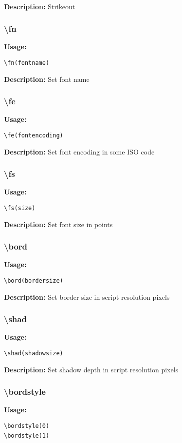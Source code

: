 \documentclass{spec}
\begin{document}
\textbf{Description:}
Strikeout

\subsubsection{\textbackslash fn}
\textbf{Usage:}
\begin{verbatim}
\fn(fontname)
\end{verbatim}

\textbf{Description:}
Set font name

\subsubsection{\textbackslash fe}
\textbf{Usage:}
\begin{verbatim}
\fe(fontencoding)
\end{verbatim}

\textbf{Description:}
Set font encoding in some ISO code

\subsubsection{\textbackslash fs}
\textbf{Usage:}
\begin{verbatim}
\fs(size)
\end{verbatim}

\textbf{Description:}
Set font size in points

\subsubsection{\textbackslash bord}
\textbf{Usage:}
\begin{verbatim}
\bord(bordersize)
\end{verbatim}

\textbf{Description:}
Set border size in script resolution pixels

\subsubsection{\textbackslash shad}
\textbf{Usage:}
\begin{verbatim}
\shad(shadowsize)
\end{verbatim}

\textbf{Description:}
Set shadow depth in script resolution pixels

\subsubsection{\textbackslash bordstyle}
\textbf{Usage:}
\begin{verbatim}
\bordstyle(0)
\bordstyle(1)
\end{verbatim}
\end{document}
